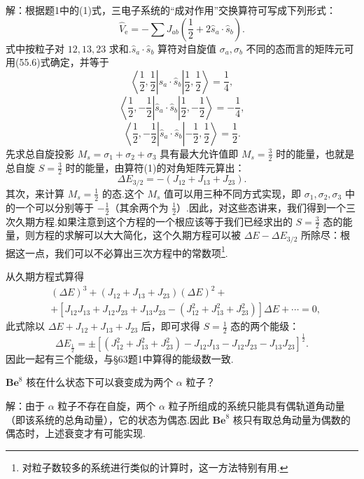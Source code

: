 \begin{xiti}
解：根据题1中的(1)式，三电子系统的“成对作用”交换算符可写成下列形式：
\setcounter{equation}{0}%
\begin{equation}
  \hat{V}_{\mathrm{e}}=-\sum J_{ab}\left(\frac{1}{2}+2\hat{s}_a\cdot\hat{s}_b\right).
\end{equation}
式中按粒子对 $12,13,23$ 求和.$\hat{s}_a\cdot\hat{s}_b$ 算符对自旋值 $\sigma_a,\sigma_b$ 不同的态而言的矩阵元可用(55.6)式确定，并等于
\begin{equation*}
  \left\langle \frac{1}{2},\frac{1}{2}\right|\hat{s}_a\cdot\hat{s}_b\left|\frac{1}{2},\frac{1}{2}\right\rangle=\frac{1}{4},
\end{equation*}
\begin{equation*}
  \left\langle \frac{1}{2},-\frac{1}{2}\right|\hat{s}_a\cdot\hat{s}_b\left|\frac{1}{2},-\frac{1}{2}\right\rangle=-\frac{1}{4},
\end{equation*}
\begin{equation*}
  \left\langle \frac{1}{2},-\frac{1}{2}\right|\hat{s}_a\cdot\hat{s}_b\left|-\frac{1}{2},\frac{1}{2}\right\rangle=\frac{1}{2}.
\end{equation*}
先求总自旋投影 $M_s=\sigma_1+\sigma_2+\sigma_3$ 具有最大允许值即 $M_s=\frac{3}{2}$ 时的能量，也就是总自旋 $S=\frac{3}{2}$ 时的能量，由算符(1)的对角矩阵元算出：
\begin{equation*}
  \Delta E_{3/2}=-\left(J_{12}+J_{13}+J_{23}\right).
\end{equation*}
其次，来计算 $M_s=\frac{1}{2}$ 的态.这个 $M_s$ 值可以用三种不同方式实现，即 $\sigma_1,\sigma_2,\sigma_3$ 中的一个可以分别等于 $-\frac{1}{2}$（其余两个为 $\frac{1}{2}$）.因此，对这些态讲来，我们得到一个三次久期方程.如果注意到这个方程的一个根应该等于我们已经求出的 $S=\frac{3}{2}$ 态的能量，则方程的求解可以大大简化，这个久期方程可以被 $\Delta E-\Delta E_{3/2}$ 所除尽：根据这一点，我们可以不必算出三次方程中的常数项\footnote{对粒子数较多的系统进行类似的计算时，这一方法特别有用.}.

从久期方程式算得
\begin{equation*}
\begin{aligned}
  &\left(\Delta E\right)^3+\left(J_{12}+J_{13}+J_{23}\right)\left(\Delta E\right)^2+\\
  &+\left[J_{12}J_{13}+J_{12}J_{23}+J_{13}J_{23}-\left(J_{12}^2+J_{13}^2+J_{23}^2\right)\right]\Delta E+\cdots=0,
\end{aligned}
\end{equation*}
此式除以 $\Delta E+J_{12}+J_{13}+J_{23}$ 后，即可求得 $S=\frac{1}{2}$ 态的两个能级：
\begin{equation*}
  \Delta E_{\frac{1}{2}}=\pm\left[\left(J_{12}^2+J_{13}^2+J_{23}^2\right)-J_{12}J_{13}-J_{12}J_{23}-J_{13}J_{23}\right]^{\frac{1}{2}}.
\end{equation*}
因此一起有三个能级，与§63题1中算得的能级数一致.

\quad $\mathbf{Be}^8$ 核在什么状态下可以衰变成为两个 $\alpha$ 粒子？

解：由于 $\alpha$ 粒子不存在自旋，两个 $\alpha$ 粒子所组成的系统只能具有偶轨道角动量（即该系统的总角动量），它的状态为偶态.因此 $\mathbf{Be}^8$ 核只有取总角动量为偶数的偶态时，上述衰变才有可能实现.

\end{xiti}
